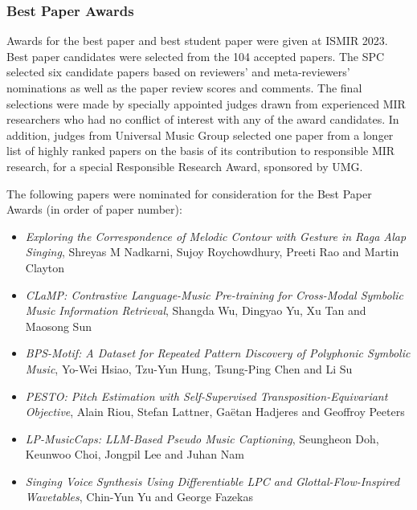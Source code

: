 \newpage
\subsubsection*{Best Paper Awards}

Awards for the best paper and best student paper were given at ISMIR 2023. Best paper candidates were selected from the 104 accepted papers. The SPC selected six candidate papers based on reviewers’ and meta-reviewers’ nominations as well as the paper review scores and comments. The final selections were made by specially appointed judges drawn from experienced MIR researchers who had no conflict of interest with any of the award candidates. In addition, judges from Universal Music Group selected one paper from a longer list of highly ranked papers on the basis of its contribution to responsible MIR research, for a special Responsible Research Award, sponsored by UMG.

The following papers were nominated for consideration for the Best Paper Awards (in order of paper number):

\begin{itemize}

\item\emph{Exploring the Correspondence of Melodic Contour with Gesture in Raga Alap Singing},
Shreyas M Nadkarni, Sujoy Roychowdhury, Preeti Rao and Martin Clayton 

\item\emph{CLaMP: Contrastive Language-Music Pre-training for Cross-Modal Symbolic Music Information Retrieval},
Shangda Wu, Dingyao Yu, Xu Tan and Maosong Sun

\item\emph{BPS-Motif: A Dataset for Repeated Pattern Discovery of Polyphonic Symbolic Music},
Yo-Wei Hsiao, Tzu-Yun Hung, Tsung-Ping Chen and Li Su

\item\emph{PESTO: Pitch Estimation with Self-Supervised Transposition-Equivariant Objective},
Alain Riou, Stefan Lattner, Gaëtan Hadjeres and Geoffroy Peeters

\item\emph{LP-MusicCaps: LLM-Based Pseudo Music Captioning},
Seungheon Doh, Keunwoo Choi, Jongpil Lee and Juhan Nam

\item\emph{Singing Voice Synthesis Using Differentiable LPC and Glottal-Flow-Inspired Wavetables},
Chin-Yun Yu and George Fazekas

\end{itemize}

